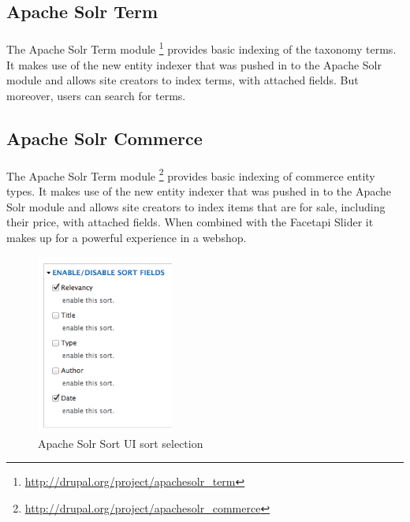 \subsection{Apache Solr Term}
\paragraph{}The Apache Solr Term module \footnote{\url{http://drupal.org/project/apachesolr_term}} provides basic indexing of the taxonomy terms. It makes use of the new entity indexer that was pushed in to the Apache Solr module and allows site creators to index terms, with attached fields. But moreover, users can search for terms.

\subsection{Apache Solr Commerce}
\paragraph{}The Apache Solr Term module \footnote{\url{http://drupal.org/project/apachesolr_commerce}} provides basic indexing of commerce entity types. It makes use of the new entity indexer that was pushed in to the Apache Solr module and allows site creators to index items that are for sale, including their price, with attached fields. When combined with the Facetapi Slider it makes up for a powerful experience in a webshop.

\begin{figure}
\begin{center}
  \vspace{-25pt}
   \includegraphics[width=0.4\textwidth]{images/implementation/apachesolr_sort.png}
   \caption{Apache Solr Sort UI sort selection}
\end{center}
\end{figure}
